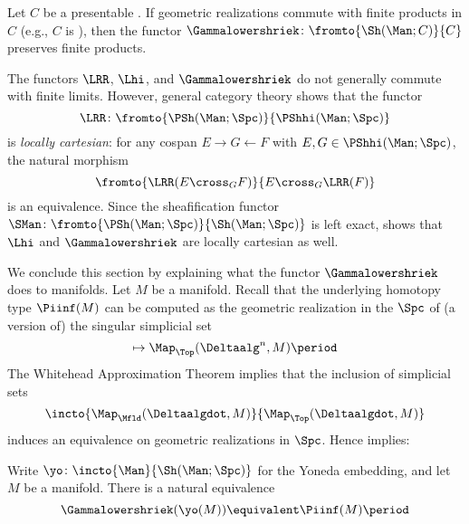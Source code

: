 \begin{corollary}\label{cor:Gammalowershriekpreservesprod}
	Let $ C $ be a presentable \category.
	If geometric realizations commute with finite products in $ C $ (e.g., $ C $ is \atopos), then the functor $ \Gammalowershriek \colon \fromto{\Sh(\Man;C)}{C} $ preserves finite products.
\end{corollary}

\begin{remark}
	The functors $ \LRR $, $ \Lhi $, and $ \Gammalowershriek $ do not generally commute with finite limits.
	However, general category theory \cite[Proposition 3.4]{MR3570135} shows that the functor
	\begin{equation*}
		\LRR \colon \fromto{\PSh(\Man;\Spc)}{\PShhi(\Man;\Spc)}
	\end{equation*}
	is \emph{locally cartesian}: for any cospan $ E \to G \leftarrow F $ with $ E, G \in \PShhi(\Man;\Spc) $, the natural morphism
	\begin{equation*}
		\fromto{\LRR(E \cross_G F)}{E \cross_G \LRR(F)}
	\end{equation*}
	is an equivalence.
	Since the sheafification functor $ \SMan \colon \fromto{\PSh(\Man;\Spc)}{\Sh(\Man;\Spc)} $ is left exact,  shows that $ \Lhi $ and $ \Gammalowershriek $ are locally cartesian as well.
\end{remark}

We conclude this section by explaining what the functor $ \Gammalowershriek $ does to manifolds.
Let $ M $ be a manifold. 
Recall that the underlying homotopy type $ \Piinf(M) $ can be computed as the geometric realization in the \category $ \Spc $ of (a version of) the singular simplicial set 
\begin{equation*}
	[n] \mapsto \Map_{\Top}(\Deltaalg^n,M) \period
\end{equation*}
The Whitehead Approximation Theorem implies that the inclusion of simplicial sets
\begin{equation*}
	\incto{\Map_{\Mfld}(\Deltaalgdot,M)}{\Map_{\Top}(\Deltaalgdot,M)}
\end{equation*}
induces an equivalence on geometric realizations in $ \Spc $.
Hence  implies:

\begin{corollary}\label{cor:Gammalowershriekofamanifold}
	Write $ \yo \colon \incto{\Man}{\Sh(\Man;\Spc)} $ for the Yoneda embedding, and let $ M $ be a manifold.
	There is a natural equivalence
	\begin{equation*}
		\Gammalowershriek(\yo(M)) \equivalent \Piinf(M) \period
	\end{equation*}
\end{corollary}

